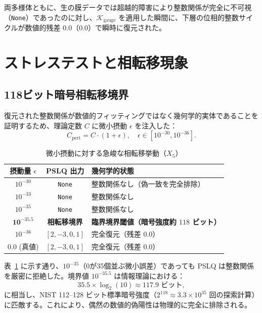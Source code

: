 \documentclass[11pt,a4paper]{article}
\theoremstyle{definition}
\begin{document}
\noindent 両多様体ともに、生の膜データでは超越的障害により整数関係が完全に不可視（\texttt{None}）であったのに対し、$\mathcal{K}_{\text{gauge}}$ を適用した瞬間に、下層の位相的整数サイクルが数値的残差 0.0（$0.0$）で瞬時に復元された。

\section{ストレステストと相転移現象}

\subsection{118ビット暗号相転移境界}
復元された整数関係が数値的フィッティングではなく幾何学的実体であることを証明するため、理論定数 $C$ に微小摂動 $\epsilon$ を注入した：
\begin{equation}
C_{\text{pert}} = C \cdot (1 + \epsilon), \quad \epsilon \in [10^{-30}, 10^{-36}].
\end{equation}

\begin{table}[htbp]
\centering
\caption{微小摂動に対する急峻な相転移挙動（$X_5$）}
\label{tab:phase_transition_ja}
\small
\begin{tabular}{ccl}
\toprule
\textbf{摂動量 $\epsilon$} & \textbf{PSLQ 出力} & \textbf{幾何学的状態} \\
\midrule
$10^{-30}$ & \texttt{None} & 整数関係なし（偽一致を完全排除） \\
$10^{-33}$ & \texttt{None} & 整数関係なし \\
$10^{-35}$ & \texttt{None} & 整数関係なし \\
\midrule
$\mathbf{10^{-35.5}}$ & \textbf{相転移境界} & \textbf{臨界境界閾値（暗号強度約 $118$ ビット）} \\
\midrule
$10^{-36}$ & $[2, -3, 0, 1]$ & 完全復元（残差 $0.0$） \\
$0.0$ (真値) & $[2, -3, 0, 1]$ & 完全復元（残差 $0.0$） \\
\bottomrule
\end{tabular}
\end{table}

表~\ref{tab:phase_transition_ja} に示す通り、$10^{-35}$（0が35個並ぶ微小誤差）であっても PSLQ は整数関係を厳密に拒絶した。境界値 $10^{-35.5}$ は情報理論における：
\begin{equation}
35.5 \times \log_2(10) \approx 117.9 \text{ ビット},
\end{equation}
に相当し、NIST 112--128 ビット標準暗号強度（$2^{118} \approx 3.3 \times 10^{35}$ 回の探索計算）に匹敵する。これにより、偶然の数値的偽陽性は物理的に完全に排除される。
\end{document}
